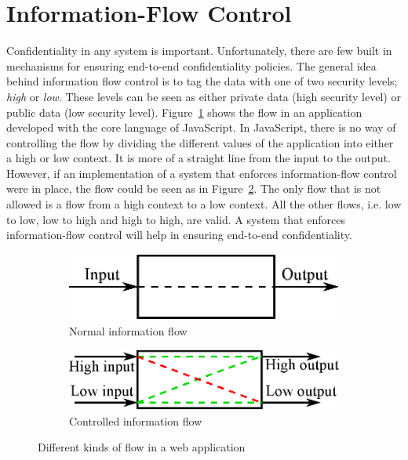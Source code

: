 \section{Information-Flow Control}
Confidentiality in any system is important. Unfortunately, there are few built in mechanisms for ensuring end-to-end confidentiality policies.\cite{ifc-jsac} The general idea behind information flow control is to tag the data with one of two security levels; \emph{high} or \emph{low}. These levels can be seen as either private data (high security level) or public data (low security level). Figure~\ref{fig:normal_flow} shows the flow in an application developed with the core language of JavaScript. In JavaScript, there is no way of controlling the flow by dividing the different values of the application into either a high or low context. It is more of a straight line from the input to the output. However, if an implementation of a system that enforces information-flow control were in place, the flow could be seen as in Figure~\ref{fig:controlled_flow}. The only flow that is not allowed is a flow from a high context to a low context. All the other flows, i.e. low to low, low to high and high to high, are valid. A system that enforces information-flow control will help in ensuring end-to-end confidentiality.
\begin{figure}[h]
  \begin{subfigure}{.5\textwidth}
    \includegraphics[scale=0.65]{images/flow_normal.eps}
    \caption{Normal information flow}
    \label{fig:normal_flow}
  \end{subfigure}
  \begin{subfigure}{.5\textwidth}
    \includegraphics[scale=0.65]{images/flow_controlled.eps}
    \caption{Controlled information flow}
    \label{fig:controlled_flow}
  \end{subfigure}
  \caption{Different kinds of flow in a web application}
  \label{fig:flows}
\end{figure}
